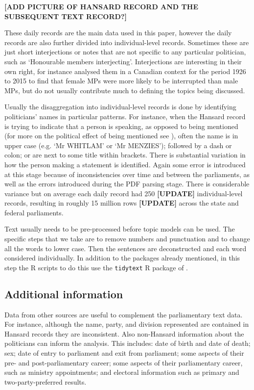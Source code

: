 \documentclass[12pt,]{article}
\theoremstyle{definition}
\theoremstyle{definition}
\theoremstyle{definition}
\theoremstyle{remark}
\begin{document}
\textbf{{[}ADD PICTURE OF HANSARD RECORD AND THE SUBSEQUENT TEXT
RECORD?{]}}

These daily records are the main data used in this paper, however the
daily records are also further divided into individual-level records.
Sometimes these are just short interjections or notes that are not
specific to any particular politician, such as `Honourable members
interjecting'. Interjections are interesting in their own right, for
instance \citet{Whyte2017} analysed them in a Canadian context for the
period 1926 to 2015 to find that female MPs were more likely to be
interrupted than male MPs, but do not usually contribute much to
defining the topics being discussed.

Usually the disaggregation into individual-level records is done by
identifying politicians' names in particular patterns. For instance,
when the Hansard record is trying to indicate that a person is speaking,
as opposed to being mentioned (for more on the political effect of being
mentioned see \citet{Alexander2018}), often the name is in upper case
(e.g. `Mr WHITLAM' or `Mr MENZIES'); followed by a dash or colon; or are
next to some title within brackets. There is substantial variation in
how the person making a statement is identified. Again some error is
introduced at this stage because of inconsistencies over time and
between the parliaments, as well as the errors introduced during the PDF
parsing stage. There is considerable variance but on average each daily
record had 250 \textbf{{[}UPDATE{]}} individual-level records, resulting
in roughly 15 million rows \textbf{{[}UPDATE{]}} across the state and
federal parliaments.

Text usually needs to be pre-processed before topic models can be used.
The specific steps that we take are to remove numbers and punctuation
and to change all the words to lower case. Then the sentences are
deconstructed and each word considered individually. In addition to the
packages already mentioned, in this step the R scripts to do this use
the \texttt{tidytext} R package of \citet{SilgeRobinson2016}.

\subsection{Additional information}\label{additional-information}

Data from other sources are useful to complement the parliamentary text
data. For instance, although the name, party, and division represented
are contained in Hansard records they are inconsistent. Also non-Hansard
information about the politicians can inform the analysis. This
includes: date of birth and date of death; sex; date of entry to
parliament and exit from parliament; some aspects of their pre- and
post-parliamentary career; some aspects of their parliamentary career,
such as ministry appointments; and electoral information such as primary
and two-party-preferred results.
\end{document}
